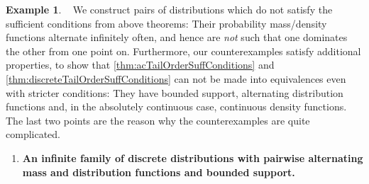 \documentclass[a4paper]{scrreprt}
\theoremstyle{definition}
\newtheorem{ex}[thm]{Example} %
\begin{document}
    \begin{ex}~
        \label{ex:tailOrderSufficientConditionsCounterexamples}
        We construct pairs of distributions which do not satisfy the sufficient conditions from above theorems:
        Their probability mass/density functions alternate infinitely often, and hence are \emph{not} such that one dominates the other from one point on.
        Furthermore, our counterexamples satisfy additional properties, to show that \ref{thm:acTailOrderSuffConditions} and \ref{thm:discreteTailOrderSuffConditions} can not be made into equivalences even with stricter conditions:
        They have bounded support, alternating distribution functions and, in the absolutely continuous case, continuous density functions.
        The last two points are the reason why the counterexamples are quite complicated.
    
        \begin{enumerate}
            \item
            \textbf{An infinite family of discrete distributions with pairwise alternating mass and distribution functions and bounded support.}
            

\end{enumerate}
\end{ex}
\end{document}
